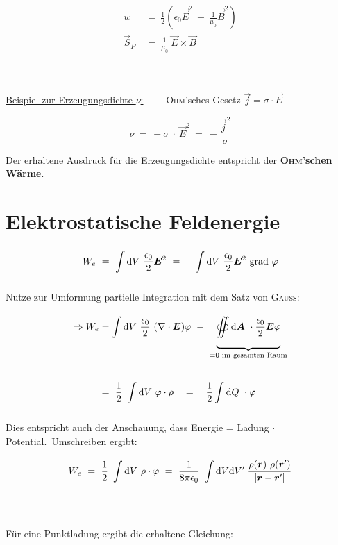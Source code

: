 \begin{align*}
w \ &= \ \frac{1}{2} \left(\epsilon_0\vec{E}^2 \ + \ \frac{1}{\mu_0}\vec{B}^2\right)\\
\vec{S}_P \ &= \ \frac{1}{\mu_0} \ \vec{E}\times\vec{B} 
\end{align*}

\ \\
\ \\
\underline{Beispiel zur Erzeugungsdichte $\nu$:}$\qquad$ \textsc{Ohm}'sches Gesetz $\vec{j} = \sigma \cdot \vec{E}$

\begin{equation*}
\nu \ = \ - \sigma \ \cdot \ \vec{E}^2 \ = \ - \frac{\vec{j}^2}{\sigma}
\end{equation*}

Der erhaltene Ausdruck für die Erzeugungsdichte entspricht der \textbf{\textsc{Ohm}'schen Wärme}.

\section{Elektrostatische Feldenergie}

\begin{equation*}
W_e \ = \ \int\limits_{{}}^{{}}\mathrm{d}{V}\  \frac{\epsilon_0}{2} \bm{E}^2 \ = \ - \int\limits_{{}}^{{}}\mathrm{d}{V}\  \frac{\epsilon_0}{2} \bm{E}^2 \ \text{grad }\varphi
\end{equation*}

Nutze zur Umformung partielle Integration mit dem Satz von \textsc{Gauss}:

\begin{align*}
\Rightarrow W_e &= \int\limits_{{}}^{{}}\mathrm{d}{V}\  \frac{\epsilon_0}{2} \ (\nabla \cdot \bm{E}) \varphi \ - \ \underbrace{\oiint\limits_{{}}^{{}}\mathrm{d}{\bm{A}}\  \cdot \frac{\epsilon_0}{2}\bm{E}\varphi}_{=0 \text{ im gesamten Raum}} \\
\\
&= \ \frac{1}{2} \ \int\limits_{{}}^{{}}\mathrm{d}{V}\  \varphi \cdot \rho \quad = \quad \frac{1}{2} \int\limits_{{}}^{{}}\mathrm{d}{Q}\  \cdot \varphi
\end{align*}

Dies entspricht auch der Anschauung, dass Energie = Ladung $\cdot$ Potential.\
Umschreiben ergibt:

\begin{equation*}
W_e \ = \ \frac{1}{2} \ \int\limits_{{}}^{{}}\mathrm{d}{V}\  \rho \cdot \varphi \ = \ \frac{1}{8\pi\epsilon_0} \ \int\mathrm{d} V\mathrm{d} V' \; \frac{\rho(\bm{r}) \ \rho(\bm{r}')}{|\bm{r}-\bm{r}'|}
\end{equation*}

\ \\
\ \\
Für eine Punktladung ergibt die erhaltene Gleichung: 

